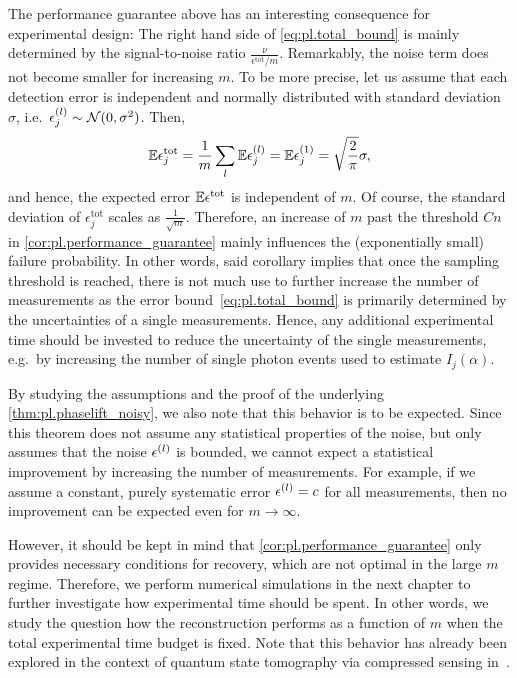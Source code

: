 The performance guarantee above has an interesting consequence for experimental design:
The right hand side of \cref{eq:pl.total_bound} is mainly determined by the signal-to-noise ratio $\frac{\nu}{\epsilon^\mathrm{tot} / m}$.
Remarkably, the noise term does not become smaller for increasing $m$.
To be more precise, let us assume that each detection error  is independent and normally distributed with standard deviation $\sigma$, i.e.\ $\epsilon^{(l)}_j \sim \mathcal{N}(0, \sigma^2)$.
Then,
\[
  \mathbb{E} \epsilon^\mathrm{tot}_j = \frac{1}{m} \sum_l \mathbb{E} \epsilon^{(l)}_j = \mathbb{E} \epsilon^{(1)}_j = \sqrt{\frac{2}{\pi}} \sigma,
\]
and hence, the expected error $\mathbb{E} \epsilon^\mathrm{tot}$ is independent of $m$.
Of course, the standard deviation of $\epsilon^\mathrm{tot}_j$ scales as $\frac{1}{\sqrt{m}}$.
Therefore, an increase of $m$ past the threshold $Cn$ in \cref{cor:pl.performance_guarantee} mainly influences the (exponentially small) failure probability.
In other words, said corollary implies that once the sampling threshold is reached, there is not much use to further increase the number of measurements as the error bound~\eqref{eq:pl.total_bound} is primarily determined by the uncertainties of a single measurements.
Hence, any additional experimental time should be invested to reduce the uncertainty of the single measurements, e.g.\ by increasing the number of single photon events used to estimate $I_j(\alpha)$.

By studying the assumptions and the proof of the underlying \cref{thm:pl.phaselift_noisy}, we also note that this behavior is to be expected.
Since this theorem does not assume any statistical properties of the noise, but only assumes that the noise $\epsilon^{(l)}$ is bounded, we cannot expect a statistical improvement by increasing the number of measurements.
For example, if we assume a constant, purely systematic error $\epsilon^{(l)} = c$ for all measurements, then no improvement can be expected even for $m\to\infty$.

However, it should be kept in mind that \cref{cor:pl.performance_guarantee} only provides necessary conditions for recovery, which are not optimal in the large $m$ regime.
Therefore, we perform numerical simulations in the next chapter to further investigate how experimental time should be spent.
In other words, we study the question how the reconstruction performs as a function of $m$ when the total experimental time budget is fixed.
Note that this behavior has already been explored in the context of quantum state tomography via compressed sensing in~\cite{Flammia_2012_Quantum}.


